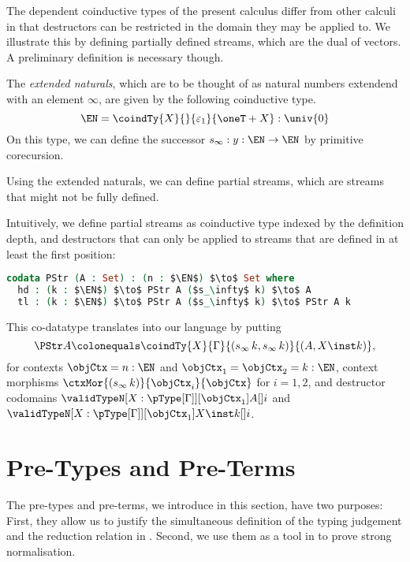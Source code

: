 \documentclass[preprint]{sigplanconf}
\begin{document}
The dependent coinductive types of the present calculus differ from other
calculi in that destructors can be restricted in the
domain they may be applied to.
We illustrate this by defining partially defined streams, which are the dual of
vectors.
A preliminary definition is necessary though.
\begin{example}
  \label{ex:extended-nats}
  The \emph{extended naturals}, which are to be thought of as natural numbers
  extendend with an element $\infty$, are given by the following coinductive
  type.
  \begin{equation*}
    \EN = \coindTy{X}{}{\varepsilon_1}{\oneT + X} : \univ{0}
  \end{equation*}
  On this type, we can define the successor $s_\infty : y : \EN \to \EN$
  by primitive corecursion.
\end{example}

Using the extended naturals, we can define partial streams, which are streams
that might not be fully defined.
\begin{example}
  Intuitively, we define partial streams as coinductive type indexed by the
  definition depth, and destructors that can only be applied to streams that
  are defined in at least the first position:
  \begin{lstlisting}[language=Agda,mathescape=true,columns=flexible]
codata PStr (A : Set) : (n : $\EN$) $\to$ Set where
  hd : (k : $\EN$) $\to$ PStr A ($s_\infty$ k) $\to$ A
  tl : (k : $\EN$) $\to$ PStr A ($s_\infty$ k) $\to$ PStr A k
  \end{lstlisting}
  This co-datatype translates into our language by putting
  \begin{equation*}
    \PStr A \colonequals
    \coindTy{X}{\Gamma}{(s_\infty \, k, s_\infty \, k)}{(A, X \inst k)},
  \end{equation*}
  for contexts $\objCtx = n : \EN$ and $\objCtx_1 = \objCtx_2 = k : \EN$,
  context morphisms $\ctxMor{(s_\infty \, k)}{\objCtx_i}{\objCtx}$ for
  $i=1,2$, and destructor codomains
  $\validTypeN[X : {\pType[\Gamma]}][\objCtx_1]{A}[]{i}$
  and  $\validTypeN[X : {\pType[\Gamma]}][\objCtx_1]{X \inst k}[]{i}$.
  \qedDef
\end{example}

 \section{Pre-Types and Pre-Terms}
\label{sec:pre-syntax}

The pre-types and pre-terms, we introduce in this section, have two purposes:
First, they allow us to justify the simultaneous definition of the
typing judgement and the reduction relation in .
Second, we use them as a tool in  to prove strong normalisation.
\end{document}
